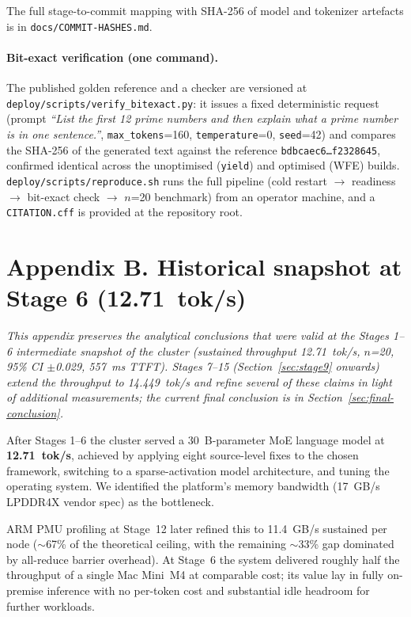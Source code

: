 \documentclass[10pt,a4paper]{article}
\begin{document}
The full stage-to-commit mapping with SHA-256 of model and tokenizer artefacts is in \texttt{docs/COMMIT-HASHES.md}.

\paragraph{Bit-exact verification (one command).} The published golden reference and a checker are versioned at \texttt{deploy/scripts/verify\_bitexact.py}: it issues a fixed deterministic request (prompt \emph{``List the first 12 prime numbers and then explain what a prime number is in one sentence.''}, \texttt{max\_tokens}=160, \texttt{temperature}=0, \texttt{seed}=42) and compares the SHA-256 of the generated text against the reference \texttt{bdbcaec6\ldots f2328645}, confirmed identical across the unoptimised (\texttt{yield}) and optimised (WFE) builds. \texttt{deploy/scripts/reproduce.sh} runs the full pipeline (cold restart $\rightarrow$ readiness $\rightarrow$ bit-exact check $\rightarrow$ $n$=20 benchmark) from an operator machine, and a \texttt{CITATION.cff} is provided at the repository root.

\section*{Appendix B. Historical snapshot at Stage 6 (12.71~tok/s)}
\label{sec:mid-summary}

\textit{This appendix preserves the analytical conclusions that were valid at the Stages 1--6 intermediate snapshot of the cluster (sustained throughput 12.71~tok/s, $n$=20, 95\% CI $\pm$0.029, 557~ms TTFT). Stages 7--15 (Section~\ref{sec:stage9} onwards) extend the throughput to 14.449~tok/s and refine several of these claims in light of additional measurements; the current final conclusion is in Section~\ref{sec:final-conclusion}.}

After Stages 1--6 the cluster served a 30~B-parameter MoE language model at \textbf{12.71~tok/s}, achieved by applying eight source-level fixes to the chosen framework, switching to a sparse-activation model architecture, and tuning the operating system. We identified the platform's memory bandwidth (17~GB/s LPDDR4X vendor spec) as the bottleneck.

ARM PMU profiling at Stage~12 later refined this to 11.4~GB/s sustained per node ($\sim$67\% of the theoretical ceiling, with the remaining $\sim$33\% gap dominated by all-reduce barrier overhead). At Stage~6 the system delivered roughly half the throughput of a single Mac Mini~M4 at comparable cost; its value lay in fully on-premise inference with no per-token cost and substantial idle headroom for further workloads.
\end{document}
